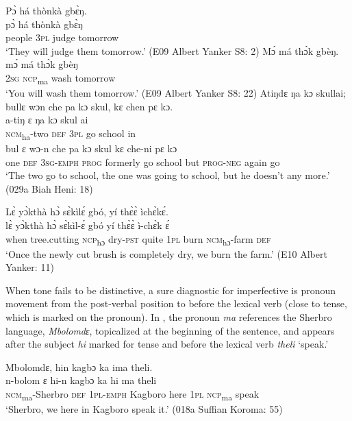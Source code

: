 \ea%
    \label{ex:112}
   \ea \label{ex:112a}  Pɔ̀ há  thònkà gbɛ̀ŋ.\\
    \gll pɔ̀      há    thònkà  gbɛ̀ŋ\\
        people  \textsc{3pl}  judge    tomorrow\\
        \glt ‘They will judge them tomorrow.' (E09 Albert Yanker S8: 2)
    \ex \label{ex:112b} Mɔ́ má thɔ̀k gbèŋ.\\
\gll        mɔ́  má    thɔ̀k    gbèŋ\\
        \textsc{2sg}  \textsc{ncp}\textsubscript{ma}    wash    tomorrow\\
\glt ‘You will wash them tomorrow.' (E09 Albert Yanker S8: 22)
\ex  \label{ex:112c} Atiŋdɛ ŋa kɔ skullai; bullɛ wɔn che pa kɔ skul, kɛ chen pɛ kɔ.\\
\gll a-tiŋ      ɛ    ŋa    kɔ    skul    ai\\
\textsc{ncm}\textsubscript{ha}{}-two  \textsc{def}  \textsc{3pl}  go    school  in\\
\gll bul  ɛ    wɔ{}-n      che  pa      kɔ    skul    kɛ    che-ni    pɛ      kɔ\\
one  \textsc{def}  \textsc{3sg-emph}  \textsc{prog}  formerly  go    school  but  \textsc{prog-neg}  again    go\\
\glt ‘The two go to school, the one was going to school, but he doesn't any more.' (029a Biah Heni: 18)

\ex \label{ex:112d} Lɛ̀ yɔ̀kthà hɔ̀ sɛ̀kìlɛ́ gbó, yí thɛ̀ɛ̀ ìchɛ̀kɛ́.\\
\gll lɛ̀      yɔ̀kthà      hɔ̀      sɛ̀kìl-ɛ́  gbó    yí    thɛ̀ɛ̀  ì-chɛ̀k      ɛ́\\
when    tree.cutting    \textsc{ncp}\textsubscript{hɔ}    dry-\textsc{pst}  quite    \textsc{1pl}  burn  \textsc{ncm}\textsubscript{hɔ}{}-farm    \textsc{def}\\
\glt ‘Once the newly cut brush is completely dry, we burn the farm.' (E10 Albert Yanker: 11)
\z
\z

When tone fails to be distinctive, a sure diagnostic for imperfective is pronoun movement from the post-verbal position to before the lexical verb (close to tense, which is marked on the pronoun). In , the pronoun \textit{ma} references the Sherbro language, \textit{Mbolomdɛ}, topicalized at the beginning of the sentence, and appears after the subject \textit{hi} marked for tense and before the lexical verb \textit{theli} ‘speak.'

\ea%
    \label{ex:113}
 Mbolomdɛ, hin kagbɔ ka ima theli.\\
\gll n-bolom        ɛ    hi-n      kagbɔ      ka    hi    ma    theli\\
\textsc{ncm}\textsubscript{ma}{}-Sherbro  \textsc{def}  \textsc{1pl}{}-\textsc{emph}  Kagboro    here  \textsc{1pl}  \textsc{ncp}\textsubscript{ma}    speak\\
\glt ‘Sherbro, we here in Kagboro speak it.' (018a Suffian Koroma: 55)
\z



